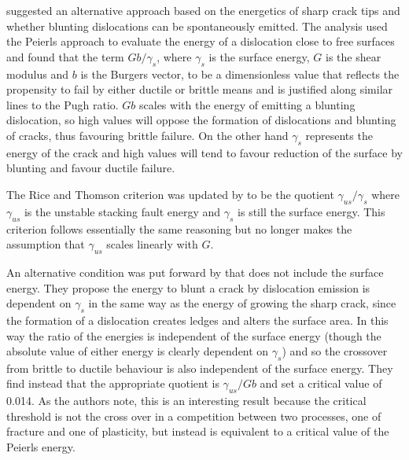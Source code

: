 


\citet{rice1974} suggested an alternative approach based on the energetics of sharp crack tips and whether blunting dislocations can be spontaneously emitted. The analysis used the Peierls approach to evaluate the energy of a dislocation close to free surfaces and found that the term $Gb/\gamma_s$, where $\gamma_s$ is the surface energy, $G$ is the shear modulus and $b$ is the Burgers vector, to be a dimensionless value that reflects the propensity to fail by either ductile or brittle means and is justified along similar lines to the Pugh ratio. $Gb$ scales with the energy of emitting a blunting dislocation, so high values will oppose the formation of dislocations and blunting of cracks, thus favouring brittle failure. On the other hand $\gamma_s$ represents the energy of the crack and high values will tend to favour reduction of the surface by blunting and favour ductile failure. 

The Rice and Thomson criterion \cite{rice1974} was updated by \citet{Rice1992} to be the quotient $\gamma_{us}/ \gamma_s$ where $\gamma_{us}$ is the unstable stacking fault energy and $\gamma_s$ is still the surface energy. This criterion follows essentially the same reasoning but no longer makes the assumption that $\gamma_{us}$ scales linearly with $G$.

An alternative condition was put forward by \citet{Zhou1994} that does not include the surface energy. They propose the energy to blunt a crack by dislocation emission is dependent on $\gamma_s$ in the same way as the energy of growing the sharp crack, since the formation of a dislocation creates ledges and alters the surface area. In this way the ratio of the energies is independent of the surface energy (though the absolute value of either energy is clearly dependent on $\gamma_s$) and so the crossover from brittle to ductile behaviour is also independent of the surface energy. They find instead that the appropriate quotient is $\gamma_{us} / Gb$ and set a critical value of 0.014. As the authors note, this is an interesting result because the critical threshold is not the cross over in a competition between two processes, one of fracture and one of plasticity, but instead is equivalent to a critical value of the Peierls energy.


